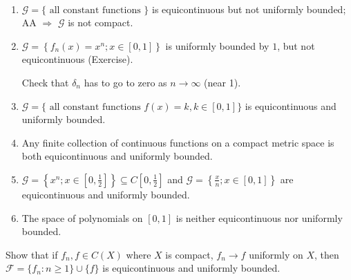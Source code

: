 \documentclass[letterpaper, reqno,11pt]{article}
\begin{document}
~

\begin{enumerate}
\item $\mathcal G = \{ \text{ all constant functions } \}$ is equicontinuous but not uniformly bounded; AA $\Rightarrow$ $\mathcal G$ is not compact.
\item $\mathcal G = \left\{ f_n(x) = x^n ; x \in [0, 1] \right\}$ is uniformly bounded by $1$, but not equicontinuous (Exercise).

  Check that $\delta_n$ has to go to zero as $n \to \infty$ (near 1).
\item $\mathcal G = \{ \text{ all constant functions $f(x) = k, k \in [0, 1]$} \}$ is equicontinuous and uniformly bounded.
\item Any finite collection of continuous functions on a compact metric space is both equicontinuous and uniformly bounded.
\item $\mathcal G = \left\{ x^n ; x \in \left[0, \frac{1}{2}\right] \right\} \subseteq C\left[0, \frac{1}{2}\right]$ and $\mathcal G = \left\{ \frac{x}{n} ; x \in [0, 1] \right\}$ are equicontinuous and uniformly bounded.
\item The space of polynomials on $[0, 1]$ is neither equicontinuous nor uniformly bounded.
\end{enumerate}

 Show that if $f_n, f \in C(X)$ where $X$ is compact, $f_n \to f$ uniformly on $X$, then $\mathcal F = \{ f_n : n \geq 1 \} \cup \{ f \}$ is equicontinuous and uniformly bounded.
\end{document}
